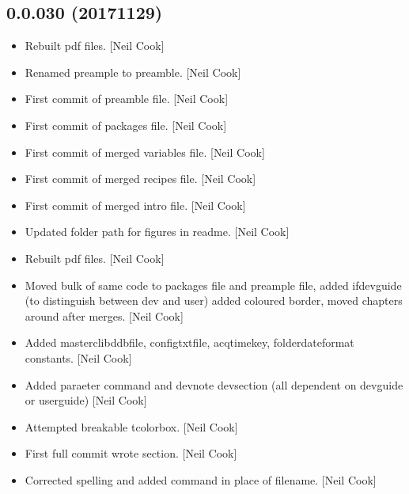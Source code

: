 \documentclass[a4paper,10pt,english]{report}
\begin{document}
\subsection{0.0.030 (2017\sphinxhyphen{}11\sphinxhyphen{}29)}
\label{\detokenize{misc/changelog:id540}}\begin{itemize}
\item {} 
Rebuilt pdf files. {[}Neil Cook{]}

\item {} 
Renamed preample to preamble. {[}Neil Cook{]}

\item {} 
First commit of preamble file. {[}Neil Cook{]}

\item {} 
First commit of packages file. {[}Neil Cook{]}

\item {} 
First commit of merged variables file. {[}Neil Cook{]}

\item {} 
First commit of merged recipes file. {[}Neil Cook{]}

\item {} 
First commit of merged intro file. {[}Neil Cook{]}

\item {} 
Updated folder path for figures in readme. {[}Neil Cook{]}

\item {} 
Rebuilt pdf files. {[}Neil Cook{]}

\item {} 
Moved bulk of same code to packages file and preample file, added
ifdevguide (to distinguish between dev and user) added coloured
border, moved chapters around after merges. {[}Neil Cook{]}

\item {} 
Added masterclibddbfile, configtxtfile, acqtimekey, folderdateformat
constants. {[}Neil Cook{]}

\item {} 
Added paraeter command and devnote devsection (all dependent on
devguide or userguide) {[}Neil Cook{]}

\item {} 
Attempted breakable tcolorbox. {[}Neil Cook{]}

\item {} 
First full commit \sphinxhyphen{} wrote section. {[}Neil Cook{]}

\item {} 
Corrected spelling and added command in place of filename. {[}Neil Cook{]}


\end{itemize}
\end{document}
